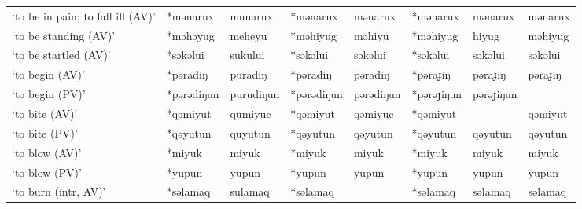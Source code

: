 \begin{landscape}
\begin{longtable}[c]{@{}p{3cm}<{\raggedright}p{2.75cm}<{\raggedright}p{2.75cm}<{\raggedright}p{2.75cm}<{\raggedright}p{2.75cm}<{\raggedright}p{2.75cm}<{\raggedright}p{2.75cm}<{\raggedright}p{2.75cm}<{\raggedright}@{}}
`to be in pain; to fall ill (AV)'                    & *mənarux           & munarux                        & *mənarux           & mənarux                    & *mənarux         & mənarux                  & mənarux                           \\
`to be standing (AV)'                                & *məhəyug           & meheyu                         & *məhiyug           & məhiyu                     & *məhiyug         & hiyug                    & məhiyug                           \\
`to be startled (AV)'                                & *səkəlui           & sukului                        & *səkəlui           & səkəlui                    & *səkəlui         & səkəlui                  & səkəlui                           \\
`to begin (AV)'                                      & *pəradiŋ           & puradiŋ                        & *pəradiŋ           & pəradiŋ                    & *pəraɟiŋ         & pəraɟiŋ                  & pəraɟiŋ                           \\
`to begin (PV)'                                      & *pərədiŋun         & purudiŋun                      & *pərədiŋun         & pərədiŋun                  & *pərəɟiŋun       & pərəɟiŋun                &                                   \\
`to bite (AV)'                                       & *qəmiyut           & qumiyuc                        & *qəmiyut           & qəmiyuc                    & *qəmiyut         &                          & qəmiyut                           \\
`to bite (PV)'                                       & *qəyutun           & quyutun                        & *qəyutun           & qəyutun                    & *qəyutun         & qəyutun                  & qəyutun                           \\
`to blow (AV)'                                       & *miyuk             & miyuk                          & *miyuk             & miyuk                      & *miyuk           & miyuk                    & miyuk                             \\
`to blow (PV)'                                       & *yupun             & yupun                          & *yupun             & yupun                      & *yupun           & yupun                    & yupun                             \\
`to burn (intr, AV)'                                 & *səlamaq           & sulamaq                        & *səlamaq           &                            & *səlamaq         & səlamaq                  & səlamaq                           \\

\end{longtable}
\end{landscape}
